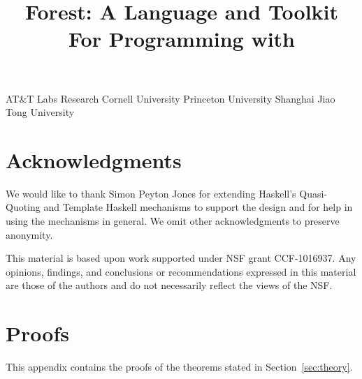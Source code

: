 \documentclass[nocopyrightspace,natbib,preprint]{sigplanconf}
\newif\ifanon\anonfalse  %
\begin{document}


\copyrightdata{} 

\title{Forest: A Language and Toolkit For Programming with \Filestores{}}

\ifanon
\authorinfo{\vskip -2in}
 	   {\vskip -2in}
           {}
\else
{}
	   {AT\&T Labs Research}{}
           {Cornell University}{}
           {Princeton University}{}
           {Shanghai Jiao Tong University}{}
\fi

\maketitle{}

\begin{abstract}  

\end{abstract}













\ifanon
\else
\section*{Acknowledgments}
We would like to thank Simon Peyton Jones for extending Haskell's
Quasi-Quoting and Template Haskell mechanisms to support the \forest{}
design and for help in using the mechanisms in general. We omit other
acknowledgments to preserve anonymity.

This material is based upon work supported under NSF grant
CCF-1016937.  Any opinions, findings, and conclusions or
recommendations expressed in this material are those of the authors
and do not necessarily reflect the views of the NSF.
\fi




\ifanon
\else
\onecolumn
\newpage
\appendix

\closeproofchan
\section{Proofs}

\noindent This appendix contains the proofs of the theorems stated in
Section~\ref{sec:theory}.

\label{sec:proof-appendix}



\fi
\end{document}
